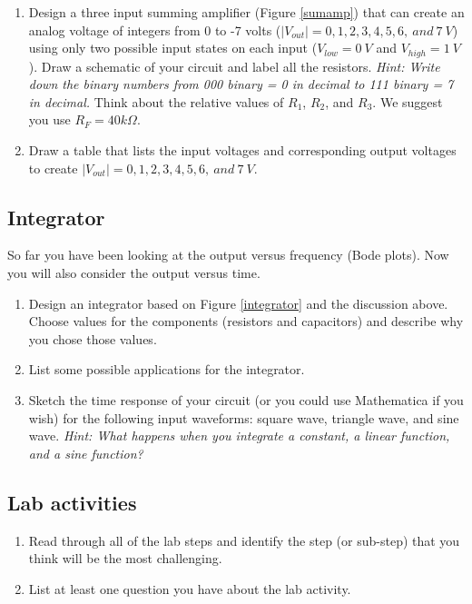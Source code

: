 \documentclass[10pt]{PhysLab1C} %
\begin{document}
\begin{enumerate}
\def\labelenumi{\arabic{enumi}.}
\item
  Design a three input summing amplifier (Figure \ref{sumamp}) that can create an
  analog voltage of integers from 0 to -7 volts
  (\(|V_{out}|= 0, 1, 2, 3, 4, 5, 6,~ and ~7 ~V\)) using only two
  possible input states on each input (\(V_{low}= 0 ~V\) and
  \(V_{high} = 1~ V\)). Draw a schematic of your circuit and label all
  the resistors. \emph{Hint: Write down the binary numbers from 000
  binary = 0 in decimal to 111 binary = 7 in decimal.} Think about the
  relative values of \(R_1\), \(R_2\), and \(R_3\). We suggest you use
  \(R_F = 40 k\Omega\).
\item
  Draw a table that lists the input voltages and corresponding output
  voltages to create \(|V_{out}|= 0, 1, 2, 3, 4, 5, 6,~ and ~7 ~V\).
\end{enumerate}

\subsection{Integrator}


So far you have been looking at the output versus frequency (Bode
plots). Now you will also consider the output versus time.

\begin{enumerate}
\def\labelenumi{\arabic{enumi}.}
\item
  Design an integrator based on Figure \ref{integrator} and the discussion above. Choose
  values for the components (resistors and capacitors) and describe why
  you chose those values.
\item
  List some possible applications for the integrator.
\item
  Sketch the time response of your circuit (or you could use Mathematica
  if you wish) for the following input waveforms: square wave, triangle
  wave, and sine wave. \emph{Hint: What happens when you integrate a
  constant, a linear function, and a sine function?}
\end{enumerate}

\subsection{Lab activities}


\begin{enumerate}
\item
  Read through all of the lab steps and identify the step (or sub-step)
  that you think will be the most challenging.
\item
  List at least one question you have about the lab activity.
\end{enumerate}
\end{document}

